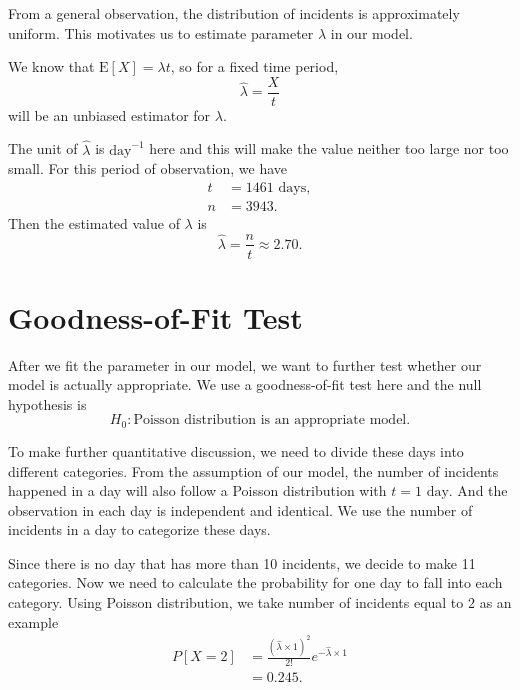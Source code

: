 \documentclass[11pt,a4paper,english]{article}
\begin{document}
From a general observation, the distribution of incidents is approximately uniform. This motivates us to estimate parameter $\lambda$ in our model.

We know that $\text{E}[X] = \lambda t$, so for a fixed time period,
\begin{equation*}
	\hat{\lambda} = \frac{X}{t}
\end{equation*}
will be an unbiased estimator for $\lambda$.

The unit of $\hat{\lambda}$ is $\text{day}^{-1}$ here and this will make the value neither too large nor too small. For this period of observation, we have 
\begin{align*}
	t &= 1461\text{ days},\\
	n &= 3943.
\end{align*}
Then the estimated value of $\lambda$ is
\begin{equation*}
	\hat{\lambda} = \frac{n}{t} \approx 2.70.
\end{equation*}

\section{Goodness-of-Fit Test}
After we fit the parameter in our model, we want to further test whether our model is actually appropriate. We use a goodness-of-fit test here and the null hypothesis is
\begin{equation*}
	H_{0}:\text{Poisson distribution is an appropriate model.}
\end{equation*}

To make further quantitative discussion, we need to divide these days into different categories. 
From the assumption of our model, the number of incidents happened in a day will also follow a Poisson distribution with $t = 1\text{ day}$. 
And the observation in each day is independent and identical. We use the number of incidents in a day to categorize these days.

Since there is no day that has more than 10 incidents, we decide to make 11 categories. Now we need to calculate the probability for one day to fall into each category. Using Poisson distribution, we take number of incidents equal to $2$ as an example
\begin{align*}
	P[X = 2] &= \frac{\left(\hat{\lambda}\times 1\right)^{2}}{2!}
	e^{-\hat{\lambda} \times 1} \\
	&= 0.245.\\
\end{align*}
\end{document}
